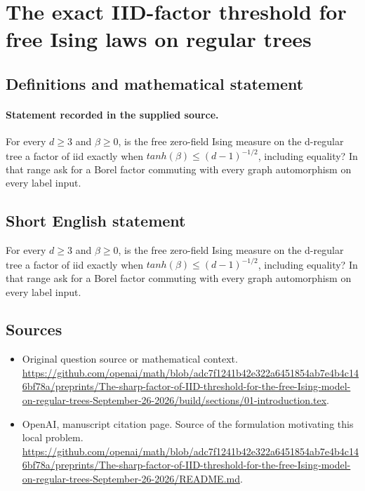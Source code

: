 \documentclass[11pt]{article}
\begin{document}
\section*{The exact IID-factor threshold for free Ising laws on regular trees}\label{30007362}
\subsection{Definitions and mathematical statement}
\paragraph{Statement recorded in the supplied source.}
For every $d\geq 3$ and $\beta \geq 0$, is the free zero-field Ising measure on the d-regular tree a factor of iid exactly when $tanh(\beta )\leq (d-1)^{-1/2}$, including equality? In that range ask for a Borel factor commuting with every graph automorphism on every label input.
\subsection{Short English statement}
For every $d\geq 3$ and $\beta \geq 0$, is the free zero-field Ising measure on the d-regular tree a factor of iid exactly when $tanh(\beta )\leq (d-1)^{-1/2}$, including equality? In that range ask for a Borel factor commuting with every graph automorphism on every label input.
\subsection{Sources}
\begin{itemize}
\item[S1] Original question source or mathematical context.
\url{https://github.com/openai/math/blob/adc7f1241b42e322a6451854ab7e4b4c146bf78a/preprints/The-sharp-factor-of-IID-threshold-for-the-free-Ising-model-on-regular-trees-September-26-2026/build/sections/01-introduction.tex}.
\item[S2] OpenAI, manuscript citation page. Source of the formulation motivating this local problem.
\url{https://github.com/openai/math/blob/adc7f1241b42e322a6451854ab7e4b4c146bf78a/preprints/The-sharp-factor-of-IID-threshold-for-the-free-Ising-model-on-regular-trees-September-26-2026/README.md}.
\end{itemize}
\end{document}
